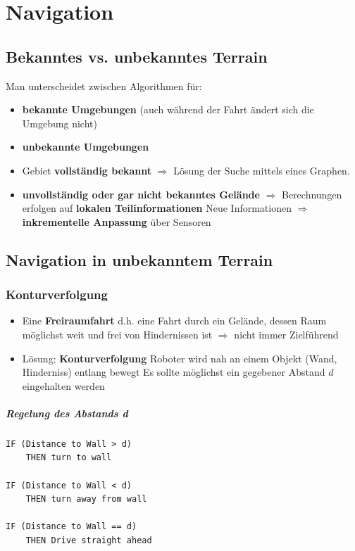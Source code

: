 \chapter{Navigation}
\section{Bekanntes vs. unbekanntes Terrain}
Man unterscheidet zwischen Algorithmen für:
\begin{itemize}
	\item \textbf{bekannte Umgebungen} (auch während der Fahrt ändert sich die Umgebung nicht)
	\item \textbf{unbekannte Umgebungen}
\end{itemize}
\begin{itemize}
	\item Gebiet \textbf{vollständig bekannt} $\Rightarrow$ Lösung der Suche mittels eines Graphen.
	\item \textbf{unvollständig oder gar nicht bekanntes Gelände} $\Rightarrow$ Berechnungen erfolgen auf \textbf{lokalen Teilinformationen}
	\subitem Neue Informationen $\Rightarrow$ \textbf{inkrementelle Anpassung} über Sensoren
\end{itemize}
\section{Navigation in unbekanntem Terrain}
\subsection{Konturverfolgung}
\begin{itemize}
	\item Eine \textbf{Freiraumfahrt} d.h. eine Fahrt durch ein Gelände, dessen Raum möglichst weit und frei von Hindernissen ist $\Rightarrow$ nicht immer Zielführend
	\item Lösung: \textbf{Konturverfolgung}
	\subitem Roboter wird nah an einem Objekt (Wand, Hinderniss) entlang bewegt
	\subitem Es sollte möglichst ein gegebener Abstand $d$ eingehalten werden
\end{itemize}
\paragraph{Regelung des Abstands d}
\begin{lstlisting}
IF (Distance to Wall > d) 
	THEN turn to wall

IF (Distance to Wall < d) 
	THEN turn away from wall

IF (Distance to Wall == d) 
	THEN Drive straight ahead
\end{lstlisting}
\newpage

